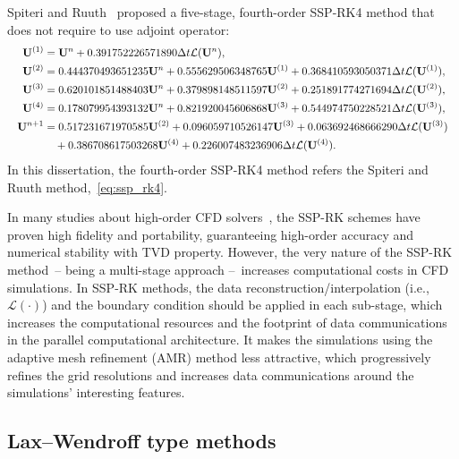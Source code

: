 Spiteri and Ruuth~\cite{spiteri2002new} proposed a five-stage, fourth-order SSP-RK4 method that does not require to use adjoint operator:
\begin{equation}\label{eq:ssp_rk4}
\resizebox{1.0\textwidth}{!}
    {$\begin{split}
        \bU^{(1)} &= \bU^{n} + 0.391752226571890 \dt \mathcal{L}(\bU^{n}), \\
        \bU^{(2)} &= 0.444370493651235 \bU^{n} + 0.555629506348765 \bU^{(1)} + 0.368410593050371 \dt \mathcal{L} (\bU^{(1)}), \\
        \bU^{(3)} &= 0.620101851488403 \bU^{n} + 0.379898148511597 \bU^{(2)} + 0.251891774271694 \dt \mathcal{L} (\bU^{(2)}), \\
        \bU^{(4)} &= 0.178079954393132 \bU^{n} + 0.821920045606868 \bU^{(3)} + 0.544974750228521 \dt \mathcal{L} (\bU^{(3)}), \\
        \bU^{n + 1} &= 0.517231671970585 \bU^{(2)} + 0.096059710526147 \bU^{(3)} + 0.063692468666290 \dt \mathcal{L} (\bU^{(3)}) \\
                    &\quad + 0.386708617503268 \bU^{(4)} + 0.226007483236906 \dt \mathcal{L} (\bU^{(4)}).
    \end{split}$}
\end{equation}
In this dissertation, the fourth-order SSP-RK4 method refers the Spiteri and Ruuth method,~\cref{eq:ssp_rk4}.

In many studies about high-order CFD solvers~\cite{gottlieb1998total,gottlieb2001strong,gottlieb2011strong,mignone2010high,del2003efficient,del2007echo,reyes2018new,reyes2019variable},
the SSP-RK schemes have proven high fidelity and portability, guaranteeing high-order accuracy
and numerical stability with TVD property.
However, the very nature of the SSP-RK method~-- being a multi-stage approach --~increases
computational costs in CFD simulations.
In SSP-RK methods, the data reconstruction/interpolation (i.e., \( \mathcal{L}(\cdot) \)) and the boundary condition
should be applied in each sub-stage, which increases the computational resources
and the footprint of data communications in the parallel computational architecture.
It makes the simulations using the adaptive mesh refinement (AMR) method less attractive,
which progressively refines the grid resolutions
and increases data communications around the simulations’ interesting features.


\subsection{Lax–Wendroff type methods}\label{subsec:laxwendroff}

